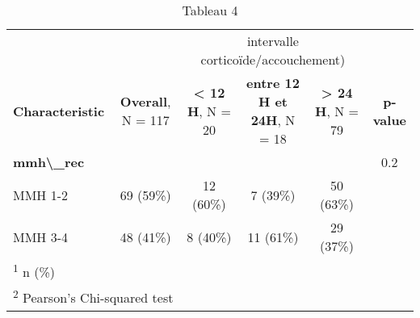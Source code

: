 \documentclass[
  10pt,
  a4paper,
]{scrartcl}
\begin{document}
\begin{table}

\caption{\label{tab:xtable4}Tableau 4}
\centering
\begin{tabular}[t]{l|c|c|c|c|c}
\hline
\multicolumn{2}{c|}{ } & \multicolumn{3}{c|}{intervalle corticoïde/accouchement)} & \multicolumn{1}{c}{ } \\
\cline{3-5}
\textbf{Characteristic} & \textbf{Overall}, N = 117 & \textbf{< 12 H}, N = 20 & \textbf{entre 12 H et 24H}, N = 18 & \textbf{> 24 H}, N = 79 & \textbf{p-value}\\
\hline
\textbf{mmh\textbackslash{}\_rec} &  &  &  &  & 0.2\\
\hline
\hspace{1em}MMH 1-2 & 69 (59\%) & 12 (60\%) & 7 (39\%) & 50 (63\%) & \\
\hline
\hspace{1em}MMH 3-4 & 48 (41\%) & 8 (40\%) & 11 (61\%) & 29 (37\%) & \\
\hline
\multicolumn{6}{l}{\rule{0pt}{1em}\textsuperscript{1} n (\%)}\\
\multicolumn{6}{l}{\rule{0pt}{1em}\textsuperscript{2} Pearson's Chi-squared test}\\
\end{tabular}
\end{table}
\end{document}
